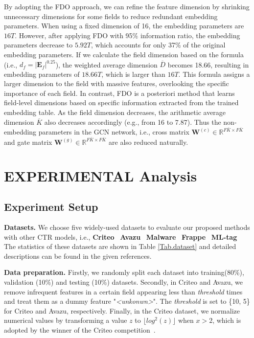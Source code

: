 \documentclass[sigconf]{acmart}
\begin{document}
By adopting the FDO approach, we can refine the feature dimension by shrinking unnecessary dimensions for some fields to reduce redundant embedding parameters. When using a fixed dimension of 16, the embedding parameters are $16T$. However, after applying FDO with 95\% information ratio, the embedding parameters decrease to $5.92T$, which accounts for only 37\% of the original embedding parameters. If we calculate the field dimension based on the formula (i.e., $d_f =\lvert \mathbf{E}_{f} \rvert^{0.25}$), the weighted average dimension $\overline{D}$ becomes 18.66, resulting in embedding parameters of $18.66T$, which is larger than $16T$. This formula assigns a larger dimension to the field with massive features, overlooking the specific importance of each field. In contrast, FDO is a posteriori method that learns field-level dimensions based on specific information extracted from the trained embedding table. As the field dimension decreases, the arithmetic average dimension $\overline{K}$ also decreases accordingly (e.g., from 16 to 7.87). Thus the non-embedding parameters in the GCN network, i.e., cross matrix $\mathbf{W}^{\left( c \right)}\in\mathbb{R}^{F\overline{K} \times F\overline{K}}$ and gate matrix $\mathbf{W}^{\left( g \right)}\in\mathbb{R}^{F\overline{K} \times F\overline{K}}$ are also reduced naturally. 



\section{EXPERIMENTAL Analysis}
\label{sec:exp_all}



\subsection{Experiment Setup}
\label{sec_exp}

\textbf{Datasets.}
We choose five widely-used datasets to evaluate our proposed methods with other CTR models, i.e., \textbf{Criteo}~\cite{kaggle_criteo, zhu2020fuxictr,wang2022enhancing}
\textbf{Avazu}~\cite{avazu,song2019autoint,meng2021autopi}
\textbf{Malware}~\cite{malware,wang2021masknet}
\textbf{Frappe}~\cite{baltrunas2015frappe, xiao2017attentional, cheng2020adaptive}
\textbf{ML-tag}~\cite{mltag,xiao2017attentional,cheng2020adaptive}
The statistics of these datasets are shown in Table \ref{Tab.dataset} and detailed descriptions can be found in the given references.


\textbf{Data preparation.} Firstly, we randomly split each dataset into training(80\%), validation (10\%) and testing (10\%) datasets. Secondly, in Criteo and Avazu, we remove infrequent features in a certain field appearing less than \textit{threshold} times and treat them as a dummy feature "\textit{<unkonwn>}". The \textit{threshold} is set to \{10, 5\} for Criteo and Avazu, respectively. Finally, in the Criteo dataset, we normalize numerical values by transforming a value $z$ to $\lfloor log^2(z) \rfloor$ when $x>2$, which is adopted by the winner of the Criteo competition~\cite{winner}.
\end{document}

